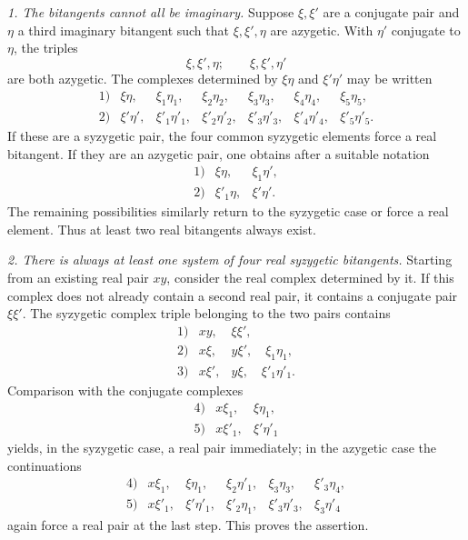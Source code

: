 \documentclass[11pt]{article}
\begin{document}
\emph{1. The bitangents cannot all be imaginary.} Suppose \(\xi,\xi'\) are a conjugate pair and \(\eta\) a third imaginary bitangent such that \(\xi,\xi',\eta\) are azygetic. With \(\eta'\) conjugate to \(\eta\), the triples
\[
 \xi,\xi',\eta;\qquad \xi,\xi',\eta'
\]
are both azygetic. The complexes determined by \(\xi\eta\) and \(\xi'\eta'\) may be written
\begin{equation}
\begin{array}{rllllll}
1)&\xi\eta,&\xi_1\eta_1,&\xi_2\eta_2,&\xi_3\eta_3,&\xi_4\eta_4,&\xi_5\eta_5,\\
2)&\xi'\eta',&\xi'_1\eta'_1,&\xi'_2\eta'_2,&\xi'_3\eta'_3,&\xi'_4\eta'_4,&\xi'_5\eta'_5.
\end{array} \tag{1}
\end{equation}
If these are a syzygetic pair, the four common syzygetic elements force a real bitangent. If they are an azygetic pair, one obtains after a suitable notation
\begin{equation}
\begin{array}{rll}
1)&\xi\eta,&\xi_1\eta',\\
2)&\xi'_1\eta,&\xi'\eta'.
\end{array} \tag{2}
\end{equation}
The remaining possibilities similarly return to the syzygetic case or force a real element. Thus at least two real bitangents always exist.

\emph{2. There is always at least one system of four real syzygetic bitangents.} Starting from an existing real pair \(xy\), consider the real complex determined by it. If this complex does not already contain a second real pair, it contains a conjugate pair \(\xi\xi'\). The syzygetic complex triple belonging to the two pairs contains
\[
\begin{array}{rll}
1)&xy,&\xi\xi',\\
2)&x\xi,&y\xi',\quad \xi_1\eta_1,\\
3)&x\xi',&y\xi,\quad \xi'_1\eta'_1.
\end{array}
\]
Comparison with the conjugate complexes
\[
\begin{array}{rll}
4)&x\xi_1,&\xi\eta_1,\\
5)&x\xi'_1,&\xi'\eta'_1
\end{array}
\]
yields, in the syzygetic case, a real pair immediately; in the azygetic case the continuations
\[
\begin{array}{rllllll}
4)&x\xi_1,&\xi\eta_1,&\xi_2\eta'_1,&\xi_3\eta_3,&\xi'_3\eta_4,\\
5)&x\xi'_1,&\xi'\eta'_1,&\xi'_2\eta_1,&\xi'_3\eta'_3,&\xi_3\eta'_4
\end{array}
\]
again force a real pair at the last step. This proves the assertion.
\end{document}
